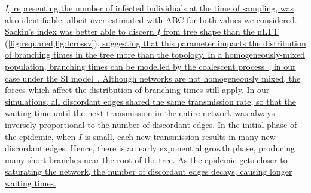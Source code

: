 \documentclass[12pt]{article}\usepackage[]{graphicx}\usepackage[]{color}
\let\mref\cref
\renewcommand{\cref}[1]{\mbox{\mref{#1}}}
\newcommand{\add}[1]{\color{blue} \uline{#1} \color{black}}
\begin{document}
\add{$I$, representing the number of infected individuals at the time of
sampling, was also identifiable, albeit over-estimated with ABC for both values
we considered. Sackin's index was better able to discern $I$ from tree shape
than the nLTT (\cref{fig:rsquared,fig:Icrossv}), suggesting that this parameter
impacts the distribution of branching times in the tree more than the topology.
In a homogeneously-mixed population, branching times can be modelled by the
coalescent process~\autocite{kingman1982coalescent}, in our case under the SI
model~\autocite{volz2009phylodynamics}. Although networks are not homogeneously
mixed, the forces which affect the distribution of branching times still apply.
In our simulations, all discordant edges shared the same
transmission rate, so that the waiting time until the next transmission in the
entire network was always inversely proportional to the number of discordant
edges. In the initial phase of the epidemic, when $I$ is small, each new
transmission results in many new discordant edges. Hence, there is an early
exponential growth phase, producing many short branches near the root of the
tree. As the epidemic gets closer to saturating the network, the number of
discordant edges decays, causing longer waiting times.}
\end{document}
